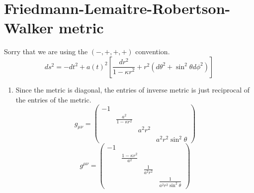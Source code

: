 \section{Friedmann-Lemaitre-Robertson-Walker metric}
Sorry that we are using the $(-,+,+,+)$ convention.
      \begin{equation}
         ds^2 = -dt^2 + a(t)^2 \left[ \frac{dr^2}{1-\kappa r^2}+ r^2(d\theta^2+\sin^2{\theta}d\phi^2) \right]
      \end{equation}
\begin{enumerate}[label=(\alph*)]
	\item Since the metric is diagonal, the entries of inverse metric is just reciprocal of the entries of the metric.
		\begin{equation*}
		g_{\mu\nu} = 
			\begin{pmatrix}
			-1 	&  & &  \\
				& \frac{a^2}{1-\kappa r^2} & & \\
				& 	 & a^2 r^2 & \\
				& 	 & & a^2 r^2 \sin^2{\theta} 
			\end{pmatrix}		
		\end{equation*}
		\begin{equation*}
		g^{\mu\nu} = 
			\begin{pmatrix}
			-1 	&  & &  \\
				& \frac{1-\kappa r^2}{a^2} & & \\
				& 	 & \frac{1}{a^2 r^2} & \\
				& 	 & & \frac{1}{a^2 r^2 \sin^2{\theta}}
			\end{pmatrix}
		\end{equation*}


\end{enumerate}
